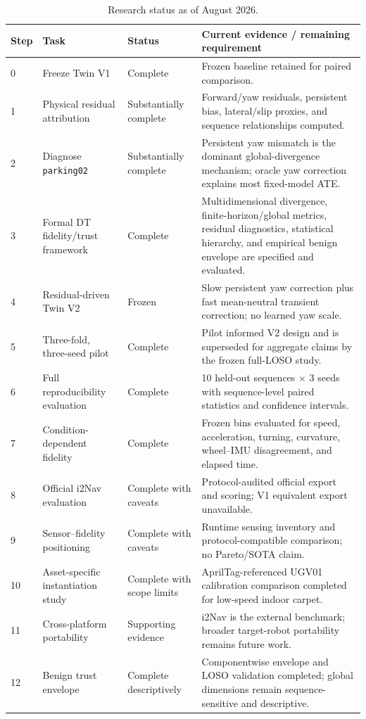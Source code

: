\documentclass[conference]{IEEEtran}
\begin{document}
\begin{table}[t]
\centering
\caption{Research status as of August 2026.}
\label{tab:status}
\footnotesize
\begin{tabular}{p{0.7cm} p{4.0cm} p{2.0cm} p{8.0cm}}
\toprule
\textbf{Step} & \textbf{Task} & \textbf{Status} & \textbf{Current evidence / remaining requirement} \\
\midrule
0 & Freeze Twin V1 & Complete & Frozen baseline retained for paired comparison. \\
1 & Physical residual attribution & Substantially complete & Forward/yaw residuals, persistent bias, lateral/slip proxies, and sequence relationships computed. \\
2 & Diagnose \texttt{parking02} & Substantially complete & Persistent yaw mismatch is the dominant global-divergence mechanism; oracle yaw correction explains most fixed-model ATE. \\
3 & Formal DT fidelity/trust framework & Complete & Multidimensional divergence, finite-horizon/global metrics, residual diagnostics, statistical hierarchy, and empirical benign envelope are specified and evaluated. \\
4 & Residual-driven Twin V2 & Frozen & Slow persistent yaw correction plus fast mean-neutral transient correction; no learned yaw scale. \\
5 & Three-fold, three-seed pilot & Complete & Pilot informed V2 design and is superseded for aggregate claims by the frozen full-LOSO study. \\
6 & Full reproducibility evaluation & Complete & 10 held-out sequences $\times$ 3 seeds with sequence-level paired statistics and confidence intervals. \\
7 & Condition-dependent fidelity & Complete & Frozen bins evaluated for speed, acceleration, turning, curvature, wheel--IMU disagreement, and elapsed time. \\
8 & Official i2Nav evaluation & Complete with caveats & Protocol-audited official export and scoring; V1 equivalent export unavailable. \\
9 & Sensor--fidelity positioning & Complete with caveats & Runtime sensing inventory and protocol-compatible comparison; no Pareto/SOTA claim. \\
10 & Asset-specific instantiation study & Complete with scope limits & AprilTag-referenced UGV01 calibration comparison completed for low-speed indoor carpet. \\
11 & Cross-platform portability & Supporting evidence & i2Nav is the external benchmark; broader target-robot portability remains future work. \\
12 & Benign trust envelope & Complete descriptively & Componentwise envelope and LOSO validation completed; global dimensions remain sequence-sensitive and descriptive. \\
\bottomrule
\end{tabular}
\end{table}
\end{document}
